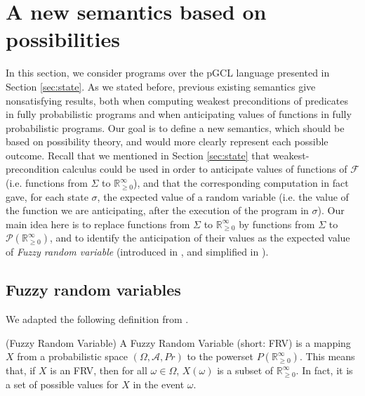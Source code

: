 \documentclass[a4paper,10pt]{llncs}
\def\RRposi {{\mathbb R_{\geq 0}^{\infty}}}
\begin{document}
\section{A new semantics based on possibilities}
\label{sec:contribution}

In this section, we consider programs over the pGCL language presented in Section \ref{sec:state}. As we stated before, previous existing semantics give nonsatisfying results, both when computing weakest preconditions of predicates in fully probabilistic programs and when anticipating values of functions in fully probabilistic programs. Our goal is to define a new semantics, which should be based on possibility theory, and would more clearly represent each possible outcome.  Recall that we mentioned in Section \ref{sec:state} that weakest-precondition calculus could be used in order to anticipate values of functions of $\mathcal{F}$ (i.e. functions from $\Sigma$ to $\RRposi$), and that the corresponding computation in fact gave, for each state $\sigma$, the expected value of a random variable (i.e. the value of the function we are anticipating, after the execution of the program in $\sigma$). Our main idea here is to replace functions from $\Sigma$ to $\RRposi$ by functions from $\Sigma$ to $\mathcal{P}(\RRposi)$, and to identify the anticipation of their values as the expected value of \textit{Fuzzy random variable} (introduced in \cite{PuriRal86}, and simplified in \cite{Shapiro09}).

\subsection{Fuzzy random variables}
We adapted the following definition from \cite{PuriRal86}.

\begin{definition}{\textnormal{(Fuzzy Random Variable)\newline}}
 A Fuzzy Random Variable (short: FRV) is a mapping $X$ from a probabilistic space $(\Omega,\mathcal{A},Pr)$ to the powerset $P(\RRposi)$. This means that, if $X$ is an FRV, then for all $\omega \in \Omega$, $X(\omega)$ is a subset of $\RRposi$. In fact, it is a set of possible values for $X$ in the event $\omega$.
\end{definition}
\end{document}
